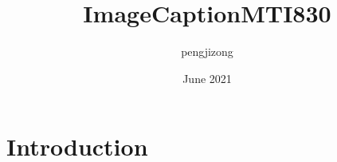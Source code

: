\documentclass{article}
\title{ImageCaptionMTI830}
\author{pengjizong }
\date{June 2021}
\begin{document}
    \maketitle


    \section{Introduction}
\end{document}
